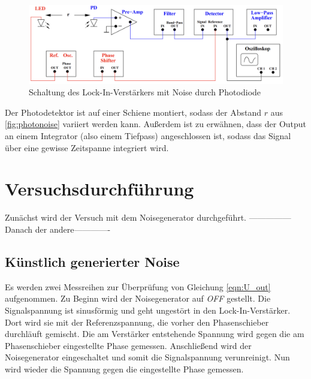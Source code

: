 \begin{figure}[H]
    \includegraphics[width=\textwidth]{Schaltung_Photodiode.png}
    \caption{Schaltung des Lock-In-Verstärkers mit Noise durch Photodiode \cite{Versuchsanleitung_v303}}
    \label{fig:photonoise}
\end{figure}

\noindent
Der Photodetektor ist auf einer Schiene montiert, sodass der Abstand $r$ aus \autoref{fig:photonoise} variiert werden kann.
Außerdem ist zu erwähnen, dass der Output an einem Integrator (also einem Tiefpass) angeschlossen ist, sodass das Signal über eine 
gewisse Zeitspanne integriert wird.


\section{Versuchsdurchführung}
Zunächst wird der Versuch mit dem Noisegenerator durchgeführt. ---------------Danach der andere-------------

\subsection{Künstlich generierter Noise}
\label{sec:durchf_kunst}
Es werden zwei Messreihen zur Überprüfung von Gleichung \eqref{eqn:U_out} aufgenommen. Zu Beginn wird der Noisegenerator auf \emph{OFF} gestellt.
Die Signalspannung ist sinusförmig und geht ungestört in den Lock-In-Verstärker. Dort wird sie mit der Referenzspannung, die vorher den 
Phasenschieber durchläuft gemischt. Die am Verstärker entstehende Spannung wird gegen die am Phasenschieber eingestellte Phase gemessen.
Anschließend wird der Noisegenerator eingeschaltet und somit die Signalspannung verunreinigt. Nun wird wieder die Spannung gegen die eingestellte 
Phase gemessen.

